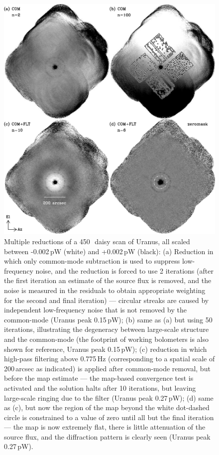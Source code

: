 \documentclass[useAMS,usenatbib,nofootinbib]{mn2e}
\begin{document}
\begin{figure}
\centering
\includegraphics[width=\linewidth]{pointmaps.pdf}
\caption{Multiple reductions of a 450\,\micron\ daisy scan of Uranus,
  all scaled between -0.002\,pW (white) and +0.002\,pW (black): (a)
  Reduction in which only common-mode subtraction is used to suppress
  low-frequency noise, and the reduction is forced to use 2 iterations
  (after the first iteration an estimate of the source flux is
  removed, and the noise is measured in the residuals to obtain
  appropriate weighting for the second and final iteration) ---
  circular streaks are caused by independent low-frequency noise that
  is not removed by the common-mode (Uranus peak 0.15\,pW); (b) same
  as (a) but using 50 iterations, illustrating the degeneracy between
  large-scale structure and the common-mode (the footprint of working
  bolometers is also shown for reference, Uranus peak 0.15\,pW); (c)
  reduction in which high-pass filtering above 0.775\,Hz
  (corresponding to a spatial scale of 200\,arcsec as indicated) is
  applied after common-mode removal, but before the map estimate ---
  the map-based convergence test is activated and the solution halts
  after 10 iterations, but leaving large-scale ringing due to the
  filter (Uranus peak 0.27\,pW); (d) same as (c), but now the region
  of the map beyond the white dot-dashed circle is constrained to a
  value of zero until all but the final iteration --- the map is now
  extremely flat, there is little attenuation of the source flux, and
  the diffraction pattern is clearly seen (Uranus peak 0.27\,pW).}
\label{fig:pointmaps}
\end{figure}
\end{document}
